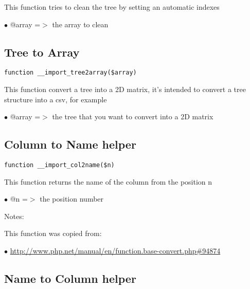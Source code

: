 \documentclass[a4paper]{book}
\def\htmladdnormallink#1#2{\href{#2}{#1}}
\begin{document}
This function tries to clean the tree by setting an automatic indexes

\begin{compactitem}
\item[\color{myblue}$\bullet$] @array =$>$ the array to clean
\end{compactitem}

\hypertarget{toc176}{}
\subsection{Tree to Array}

\begin{lstlisting}
function __import_tree2array($array)
\end{lstlisting}

This function convert a tree into a 2D matrix, it's intended to convert
a tree structure into a csv, for example

\begin{compactitem}
\item[\color{myblue}$\bullet$] @array =$>$ the tree that you want to convert into a 2D matrix
\end{compactitem}

\hypertarget{toc177}{}
\subsection{Column to Name helper}

\begin{lstlisting}
function __import_col2name($n)
\end{lstlisting}

This function returns the name of the column from the position n

\begin{compactitem}
\item[\color{myblue}$\bullet$] @n =$>$ the position number
\end{compactitem}

Notes:

This function was copied from:

\begin{compactitem}
\item[\color{myblue}$\bullet$] \htmladdnormallink{http://www.php.net/manual/en/function.base-convert.php\#94874}{http://www.php.net/manual/en/function.base-convert.php\#94874}
\end{compactitem}

\hypertarget{toc178}{}
\subsection{Name to Column helper}
\end{document}
